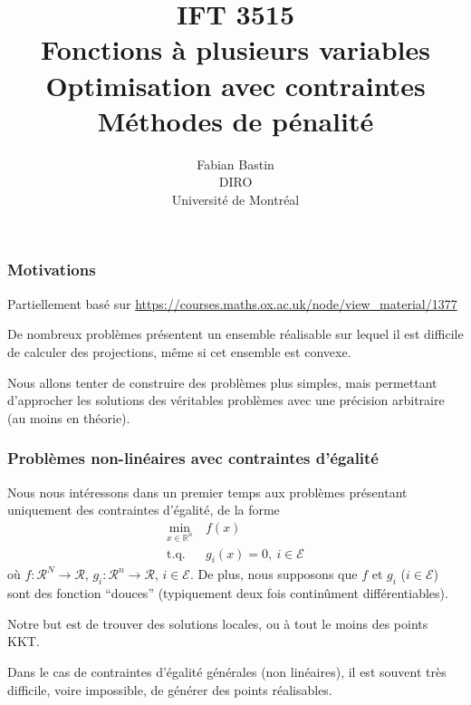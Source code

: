 \documentclass[t,usepdftitle=false]{beamer}
\title[IFT3515]{IFT 3515\\Fonctions à plusieurs variables\\Optimisation avec contraintes\\Méthodes de pénalité}
\author[Fabian Bastin]{Fabian Bastin\\DIRO\\Université de Montréal}
\date{}
\def\cE{\mathcal{E}}
\def\cR{\mathcal{R}}
\def\RR{\mathbb{R}}
\begin{document}
\frame{\titlepage}


\begin{frame}
\frametitle{Motivations}

Partiellement basé sur \url{https://courses.maths.ox.ac.uk/node/view_material/1377}

\mbox{}

De nombreux problèmes présentent un ensemble réalisable sur lequel il est difficile de calculer des projections, même si cet ensemble est convexe.

\mbox{}

Nous allons tenter de construire des problèmes plus simples, mais permettant d'approcher les solutions des véritables problèmes avec une précision arbitraire (au moins en théorie).

\end{frame}

\begin{frame}
\frametitle{Problèmes non-linéaires avec contraintes d'égalité}

Nous nous intéressons dans un premier temps aux problèmes présentant uniquement des contraintes d'égalité, de la forme
\begin{align*}
\min_{x \in \RR^n}\ & f(x) \\
\mbox{t.q. } &g_i(x) = 0,\ i \in \cE
\end{align*}
où $f: \cR^N \rightarrow \cR$, $g_i: \cR^n \rightarrow \cR$, $i \in \cE$. De plus, nous supposons que $f$ et $g_i$ ($i \in \cE$) sont des fonction ``douces'' (typiquement deux fois continûment différentiables).

\mbox{}

Notre but est de trouver des solutions locales, ou à tout le moins des points KKT.

\mbox{}

Dans le cas de contraintes d'égalité générales (non linéaires), il est souvent très difficile, voire impossible, de générer des points réalisables.

\end{frame}
\end{document}
